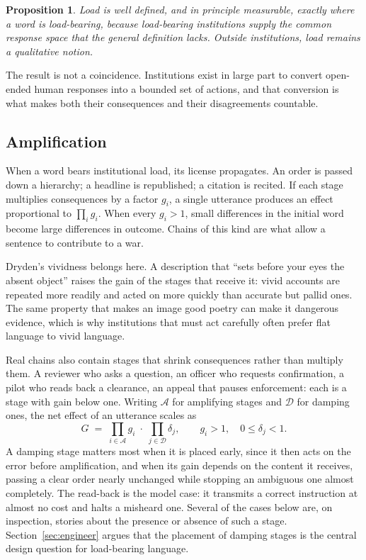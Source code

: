 \documentclass[11pt,a4paper]{article}
\theoremstyle{plain}
\newtheorem{proposition}{Proposition}
\theoremstyle{definition}
\theoremstyle{remark}
\begin{document}
\begin{proposition}
Load is well defined, and in principle measurable, exactly where a word is load-bearing, because load-bearing institutions supply the common response space that the general definition lacks. Outside institutions, load remains a qualitative notion.
\end{proposition}

The result is not a coincidence. Institutions exist in large part to convert open-ended human responses into a bounded set of actions, and that conversion is what makes both their consequences and their disagreements countable.

\subsection{Amplification}

When a word bears institutional load, its license propagates. An order is passed down a hierarchy; a headline is republished; a citation is recited. If each stage multiplies consequences by a factor $g_i$, a single utterance produces an effect proportional to $\prod_i g_i$. When every $g_i > 1$, small differences in the initial word become large differences in outcome. Chains of this kind are what allow a sentence to contribute to a war.

Dryden's vividness belongs here. A description that ``sets before your eyes the absent object'' raises the gain of the stages that receive it: vivid accounts are repeated more readily and acted on more quickly than accurate but pallid ones. The same property that makes an image good poetry can make it dangerous evidence, which is why institutions that must act carefully often prefer flat language to vivid language.

Real chains also contain stages that shrink consequences rather than multiply them. A reviewer who asks a question, an officer who requests confirmation, a pilot who reads back a clearance, an appeal that pauses enforcement: each is a stage with gain below one. Writing $\mathcal{A}$ for amplifying stages and $\mathcal{D}$ for damping ones, the net effect of an utterance scales as
\[
G \;=\; \prod_{i\in\mathcal{A}} g_i \;\cdot\; \prod_{j\in\mathcal{D}} \delta_j, \qquad g_i > 1,\quad 0 \le \delta_j < 1 .
\]
A damping stage matters most when it is placed early, since it then acts on the error before amplification, and when its gain depends on the content it receives, passing a clear order nearly unchanged while stopping an ambiguous one almost completely. The read-back is the model case: it transmits a correct instruction at almost no cost and halts a misheard one. Several of the cases below are, on inspection, stories about the presence or absence of such a stage. Section~\ref{sec:engineer} argues that the placement of damping stages is the central design question for load-bearing language.
\end{document}
